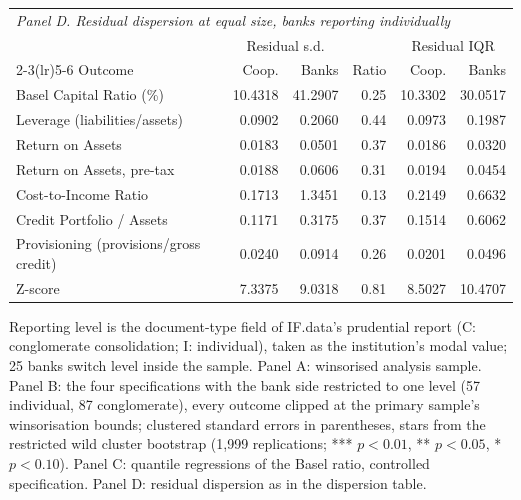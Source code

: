 \par\medskip
\begin{tabular}{lrrrrr}
\toprule
\multicolumn{6}{l}{\textit{Panel D. Residual dispersion at equal size, banks reporting individually}} \\
 & \multicolumn{2}{c}{Residual s.d.} & & \multicolumn{2}{c}{Residual IQR} \\
\cmidrule(lr){2-3}\cmidrule(lr){5-6}
Outcome & Coop. & Banks & Ratio & Coop. & Banks \\
\midrule
Basel Capital Ratio (\%) & 10.4318 & 41.2907 & 0.25 & 10.3302 & 30.0517 \\
Leverage (liabilities/assets) & 0.0902 & 0.2060 & 0.44 & 0.0973 & 0.1987 \\
Return on Assets & 0.0183 & 0.0501 & 0.37 & 0.0186 & 0.0320 \\
Return on Assets, pre-tax & 0.0188 & 0.0606 & 0.31 & 0.0194 & 0.0454 \\
Cost-to-Income Ratio & 0.1713 & 1.3451 & 0.13 & 0.2149 & 0.6632 \\
Credit Portfolio / Assets & 0.1171 & 0.3175 & 0.37 & 0.1514 & 0.6062 \\
Provisioning (provisions/gross credit) & 0.0240 & 0.0914 & 0.26 & 0.0201 & 0.0496 \\
Z-score & 7.3375 & 9.0318 & 0.81 & 8.5027 & 10.4707 \\
\bottomrule
\end{tabular}
\begin{tablenotes}[flushleft]\footnotesize
\item Reporting level is the document-type field of IF.data's prudential report (C: conglomerate consolidation; I: individual), taken as the institution's modal value; 25 banks switch level inside the sample. Panel A: winsorised analysis sample. Panel B: the four specifications with the bank side restricted to one level (57 individual, 87 conglomerate), every outcome clipped at the primary sample's winsorisation bounds; clustered standard errors in parentheses, stars from the restricted wild cluster bootstrap (1,999 replications; *** $p<0.01$, ** $p<0.05$, * $p<0.10$). Panel C: quantile regressions of the Basel ratio, controlled specification. Panel D: residual dispersion as in the dispersion table.
\end{tablenotes}
